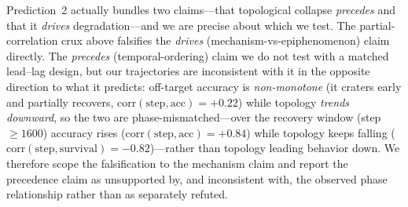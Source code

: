\documentclass{article}
\begin{document}
\medskip
\noindent Prediction~2 actually bundles two claims---that topological collapse \emph{precedes} and
that it \emph{drives} degradation---and we are precise about which we test. The partial-correlation
crux above falsifies the \emph{drives} (mechanism-vs-epiphenomenon) claim directly. The \emph{precedes}
(temporal-ordering) claim we do not test with a matched lead--lag design, but our trajectories are
inconsistent with it in the opposite direction to what it predicts: off-target accuracy is
\emph{non-monotone} (it craters early and partially recovers, \(\mathrm{corr}(\text{step},\text{acc})
= +0.22\)) while topology \emph{trends downward}, so the two are phase-mismatched---over the recovery
window (step \(\geq 1600\)) accuracy rises (\(\mathrm{corr}(\text{step},\text{acc}) = +0.84\)) while
topology keeps falling (\(\mathrm{corr}(\text{step},\text{survival}) = -0.82\))---rather than topology
leading behavior down. We therefore scope
the falsification to the mechanism claim and report the precedence claim as unsupported by, and
inconsistent with, the observed phase relationship rather than as separately refuted.
\end{document}

